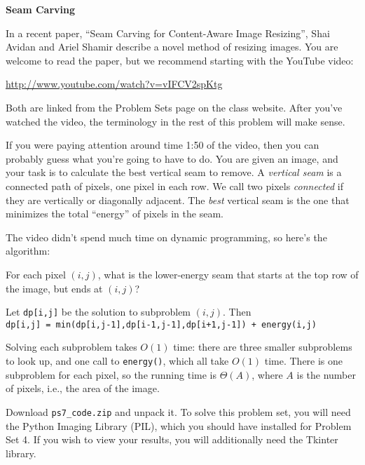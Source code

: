 \documentclass[12pt,twoside]{article}
\begin{document}
\begin{problems}


\problem {} \textbf{Seam Carving}



  In a recent paper, ``Seam Carving for Content-Aware Image
  Resizing'', Shai Avidan and Ariel Shamir describe a novel method of
  resizing images. You are welcome to read the paper, but we recommend
  starting with the YouTube video:

  \centerline{\url{http://www.youtube.com/watch?v=vIFCV2spKtg}}

  Both are linked
  from the Problem Sets page on the class website. After you've
  watched the video, the terminology in the rest of this problem will
  make sense.

  If you were paying attention around time 1:50 of the video, then you
  can probably guess what you're going to have to do. You are given an
  image, and your task is to calculate the best vertical seam to
  remove. A \emph{vertical seam} is a connected path of pixels, one
  pixel in each row. We call two pixels \emph{connected} if they are
  vertically or diagonally adjacent. The \emph{best} vertical seam is
  the one that minimizes the total ``energy'' of pixels in the seam.

  The video didn't spend much time on dynamic programming,
  so here's the algorithm:

  \begin{description}
\setlength{\labelsep}{0.5em}
  \item[Subproblems:] For each pixel $(i,j)$, what is the lower-energy
    seam that starts at the top row of the image, but ends at $(i,j)$?
  \item[Relation:] Let \verb|dp[i,j]| be the solution to subproblem
  $(i,j)$. Then \\
  \verb|dp[i,j] = min(dp[i,j-1],dp[i-1,j-1],dp[i+1,j-1]) + energy(i,j)|
  \item[Analysis:] Solving each subproblem takes $O(1)$ time: there
    are three smaller subproblems to look up, and one call to
    \verb|energy()|, which all take $O(1)$ time. There is one
    subproblem for each pixel, so the running time is $\Theta(A)$,
    where $A$ is the number of pixels, i.e., the area of the image.
  \end{description}

  Download \verb|ps7_code.zip| and unpack it.
  To solve this problem set,
  you will need the Python Imaging Library (PIL),
  which you should have installed for Problem Set 4.
  If you wish to view your results,
  you will additionally need the Tkinter library.


\end{problems}
\end{document}
